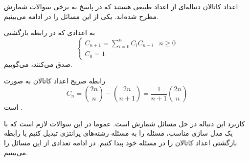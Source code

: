 \p
اعداد کاتالان دنباله‌ای از اعداد طبیعی هستند که در پاسخ به برخی سوالات شمارش مطرح شده‌اند.
یکی از این مسائل را در ادامه می‌بینیم.


\begin{DEFINITION}
    \p
      به اعدادی که در رابطه بازگشتی
    \[\begin{cases}
        C_{n+1}=\sum_{i=0}^n C_iC_{n-i} & n\geq 0 \\
        
        C_0=1
    \end{cases}
    \]
    صدق می‌کنند،
      می‌گوییم.
\end{DEFINITION}


\begin{THEOREM}
  \p
    رابطه صریح اعداد کاتالان به صورت
    \[C_n=\binom{2n}{n}-\binom{2n}{n+1}=\dfrac{1}{n+1}\binom{2n}{n}\]
    است
    .
\end{THEOREM}

 کاربرد این دنباله در حل مسائل شمارش است. عموما در این سوالات لازم است که با یک مدل سازی مناسب، مسئله را به مسئله رشته‌های پرانتزی تبدیل کنیم یا رابطه بازگشتی اعداد کاتالان را در مسئله خود پیدا کنیم. در ادامه تعدادی از این مسائل را می‌بینیم.

